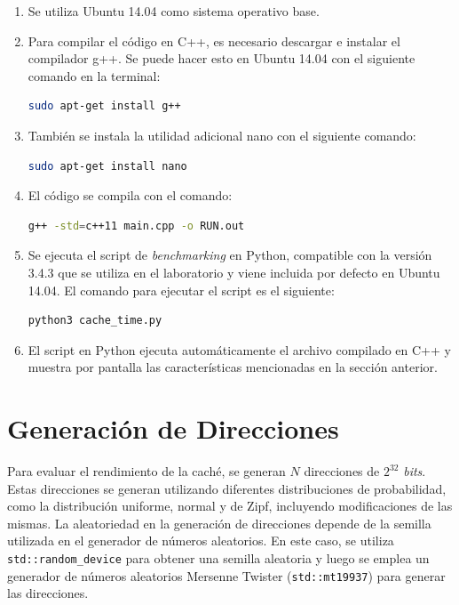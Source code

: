 \documentclass[12pt]{article}
\begin{document}
\begin{enumerate}
	\item Se utiliza Ubuntu 14.04 como sistema operativo base.
	
	\item Para compilar el código en C++, es necesario descargar e instalar el compilador g++. Se puede hacer esto en Ubuntu 14.04 con el siguiente comando en la terminal:
	
	\begin{lstlisting}[language=bash]
	sudo apt-get install g++
	\end{lstlisting}

	\item También se instala la utilidad adicional nano con el siguiente comando:
	
	\begin{lstlisting}[language=bash]
	sudo apt-get install nano
	\end{lstlisting}

	\item El código se compila con el comando:
	
	\begin{lstlisting}[language=bash]
	g++ -std=c++11 main.cpp -o RUN.out
	\end{lstlisting}
	
	\item Se ejecuta el script de \textit{benchmarking} en Python, compatible con la versión 3.4.3 que se utiliza en el laboratorio y viene incluida por defecto en Ubuntu 14.04. El comando para ejecutar el script es el siguiente:
	
	\begin{lstlisting}[language=bash]
	python3 cache_time.py
	\end{lstlisting}
	
	\item El script en Python ejecuta automáticamente el archivo compilado en C++ y muestra por pantalla las características mencionadas en la sección anterior.
\end{enumerate}
\newpage
%
\section*{Generación de Direcciones}
\vspace{-5pt}
Para evaluar el rendimiento de la caché, se generan $N$ direcciones de $2^{32}$ \textit{bits}. Estas direcciones se generan utilizando diferentes distribuciones de probabilidad, como la distribución uniforme, normal y de Zipf, incluyendo modificaciones de las mismas. La aleatoriedad en la generación de direcciones depende de la semilla utilizada en el generador de números aleatorios. En este caso, se utiliza \lstinline|std::random_device| para obtener una semilla aleatoria y luego se emplea un generador de números aleatorios Mersenne Twister (\lstinline|std::mt19937|) para generar las direcciones.
\newline
\end{document}
